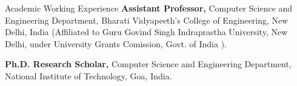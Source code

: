 \begin{rubric}{Academic Working Experience}
	\entry*[2012 -- Present]%
		\textbf{Assistant Professor,} Computer Science and Engineering Department, Bharati Vidyapeeth's College of Engineering, New Delhi, India (Affiliated to Guru Govind Singh Indraprastha University, New Delhi, under University Grants Comission, Govt. of India ).

	\entry*[2021 -- Present]%
		\textbf{Ph.D. Research Scholar,} Computer Science and Engineering Department, National Institute of Technology, Goa, India.
	
	\end{rubric}